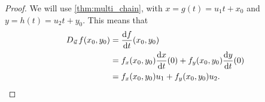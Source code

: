 
\begin{proof}
We will use \autoref{thm:multi_chain}, with $x=g(t)=u_1t+x_0$ and $y=h(t)=u_2t+y_0$.  This means that
\begin{align*}
D_{\vec u\,}f(x_0,y_0)
&=\frac{\operatorname{d}\! f}{\operatorname{d}\! t}(x_0,y_0)\\
&=f_x(x_0,y_0)\frac{\operatorname{d}\! x}{\operatorname{d}\! t}(0)+f_y(x_0,y_0)\frac{\operatorname{d}\! y}{\operatorname{d}\! t}(0)\\
&=f_x(x_0,y_0)u_1 + f_y(x_0,y_0)u_2.\qedhere
\end{align*}
\end{proof}


